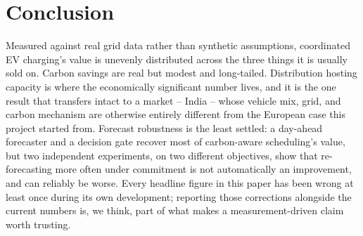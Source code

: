 \documentclass[journal]{IEEEtran}
\begin{document}
\section{Conclusion}
\label{sec:conclusion}

Measured against real grid data rather than synthetic assumptions, coordinated EV charging's value is unevenly distributed across the three things it is usually sold on. Carbon savings are real but modest and long-tailed. Distribution hosting capacity is where the economically significant number lives, and it is the one result that transfers intact to a market -- India -- whose vehicle mix, grid, and carbon mechanism are otherwise entirely different from the European case this project started from. Forecast robustness is the least settled: a day-ahead forecaster and a decision gate recover most of carbon-aware scheduling's value, but two independent experiments, on two different objectives, show that re-forecasting more often under commitment is not automatically an improvement, and can reliably be worse. Every headline figure in this paper has been wrong at least once during its own development; reporting those corrections alongside the current numbers is, we think, part of what makes a measurement-driven claim worth trusting.
\end{document}
